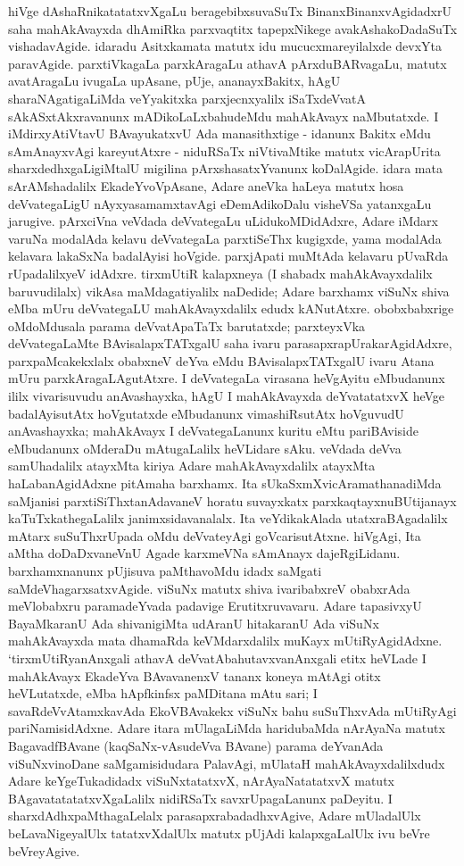 hiVge dAshaRnikatatatxvXgaLu beragebibxsuvaSuTx BinanxBinanxvAgidadxrU saha mahAkAvayxda dhAmiRka parxvaqtitx tapepxNikege avakAshakoDadaSuTx vishadavAgide. idaradu Asitxkamata matutx idu mucucxmareyilalxde devxYta paravAgide. parxtiVkagaLa parxkAragaLu athavA pArxduBARvagaLu, matutx avatAragaLu ivugaLa upAsane, pUje, ananayxBakitx, hAgU sharaNAgatigaLiMda veYyakitxka parxjecnxyalilx iSaTxdeVvatA sAkASxtAkxravanunx mADikoLaLxbahudeMdu mahAkAvayx naMbutatxde. I iMdirxyAtiVtavU BAvayukatxvU Ada manasithxtige - idanunx Bakitx eMdu sAmAnayxvAgi kareyutAtxre - niduRSaTx niVtivaMtike matutx vicArapUrita sharxdedhxgaLigiMtalU migilina pArxshasatxYvanunx koDalAgide. idara mata sArAMshadalilx EkadeYvoVpAsane, Adare aneVka haLeya matutx hosa deVvategaLigU nAyxyasamamxtavAgi eDemAdikoDalu visheVSa yatanxgaLu jarugive. pArxciVna veVdada deVvategaLu uLidukoMDidAdxre, Adare iMdarx varuNa modalAda kelavu deVvategaLa parxtiSeThx kugigxde, yama modalAda kelavara lakaSxNa badalAyisi hoVgide. parxjApati muMtAda kelavaru pUvaRda rUpadalilxyeV idAdxre. tirxmUtiR kalapxneya (I shabadx mahAkAvayxdalilx baruvudilalx) vikAsa maMdagatiyalilx naDedide; Adare barxhamx viSuNx shiva eMba mUru deVvategaLU mahAkAvayxdalilx edudx kANutAtxre. obobxbabxrige oMdoMdusala parama deVvatApaTaTx barutatxde; parxteyxVka deVvategaLaMte BAvisalapxTATxgalU saha ivaru parasapxrapUrakarAgidAdxre, parxpaMcakekxlalx obabxneV deYva eMdu BAvisalapxTATxgalU ivaru Atana mUru parxkAragaLAgutAtxre. I deVvategaLa virasana heVgAyitu eMbudanunx ililx vivarisuvudu anAvashayxka, hAgU I mahAkAvayxda deYvatatatxvX heVge badalAyisutAtx hoVgutatxde eMbudanunx vimashiRsutAtx hoVguvudU anAvashayxka; mahAkAvayx I deVvategaLanunx kuritu eMtu pariBAviside eMbudanunx oMderaDu mAtugaLalilx heVLidare sAku. veVdada deVva samUhadalilx atayxMta kiriya Adare mahAkAvayxdalilx atayxMta haLabanAgidAdxne pitAmaha barxhamx. Ita sUkaSxmXvicAramathanadiMda saMjanisi parxtiSiThxtanAdavaneV horatu suvayxkatx parxkaqtayxnuBUtijanayx kaTuTxkathegaLalilx janimxsidavanalalx. Ita veYdikakAlada utatxraBAgadalilx mAtarx suSuThxrUpada oMdu deVvateyAgi goVcarisutAtxne. hiVgAgi, Ita aMtha doDaDxvaneVnU Agade karxmeVNa sAmAnayx dajeRgiLidanu. barxhamxnanunx pUjisuva paMthavoMdu idadx saMgati saMdeVhagarxsatxvAgide. viSuNx matutx shiva ivaribabxreV obabxrAda meVlobabxru paramadeYvada padavige Erutitxruvavaru. Adare tapasivxyU BayaMkaranU Ada shivanigiMta udAranU hitakaranU Ada viSuNx mahAkAvayxda mata dhamaRda keVMdarxdalilx muKayx mUtiRyAgidAdxne. `tirxmUtiRyanAnxgali athavA deVvatAbahutavxvanAnxgali etitx heVLade I mahAkAvayx EkadeYva BAvavanenxV tananx koneya mAtAgi otitx heVLutatxde, eMba hApfkinfsx paMDitana mAtu sari; I savaRdeVvAtamxkavAda EkoVBAvakekx viSuNx bahu suSuThxvAda mUtiRyAgi pariNamisidAdxne. Adare itara mUlagaLiMda haridubaMda nArAyaNa matutx BagavadfBAvane (kaqSaNx-vAsudeVva BAvane) parama deYvanAda viSuNxvinoDane saMgamisidudara PalavAgi, mUlataH mahAkAvayxdalilxdudx Adare keYgeTukadidadx viSuNxtatatxvX, nArAyaNatatatxvX matutx BAgavatatatatxvXgaLalilx nidiRSaTx savxrUpagaLanunx paDeyitu. I sharxdAdhxpaMthagaLelalx parasapxrabadadhxvAgive, Adare mUladalUlx beLavaNigeyalUlx tatatxvXdalUlx matutx pUjAdi kalapxgaLalUlx ivu beVre beVreyAgive.


